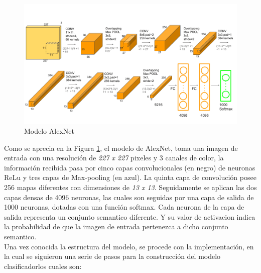 				\begin{figure}[ht]
					\centering
					\includegraphics[scale=0.4]{Figs/5.png}
					\caption{Modelo AlexNet}
					\label{fig:AlexNet}
				\end{figure}
				\newpage	
				Como se aprecia en la Figura \ref{fig:AlexNet}, el modelo de AlexNet, toma una imagen de entrada con una resolución de \textit{227 x 227} pixeles y 3 canales de color, la información recibida pasa por cinco capas convolucionales (en negro) de neuronas ReLu y tres capas de Max-pooling (en azul). La quinta capa de convolución posee 256 mapas diferentes con dimensiones de \textit{13 x 13}. Seguidamente se aplican las dos capas densas de 4096 neuronas, las cuales son seguidas por una capa de salida de 1000 neuronas, dotadas con una función softmax. Cada neurona de la capa de salida representa un conjunto semantico diferente. Y su valor de activacion indica la probabilidad de que la imagen de entrada pertenezca a dicho conjunto semantico.\\
		
				
				Una vez conocida la estructura del modelo, se procede con la implementación, en la cual se siguieron una serie de pasos para la construcción del modelo clasificadorlos cuales son:
				
